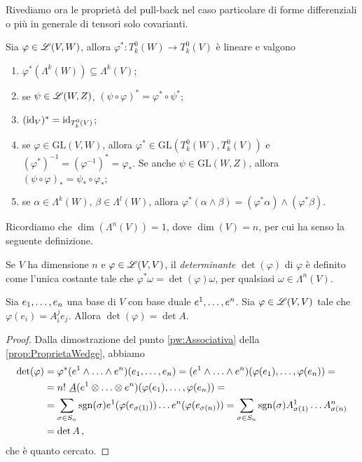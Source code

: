 Rivediamo ora le proprietà del pull-back nel caso particolare di forme differenziali o più in generale di tensori solo covarianti.
\begin{proposition} \label{prop:PullBackForme}
	Sia $\varphi\in\Lin(V,W)$, allora $\varphi^* : T^0_k(W) \to T^0_k(V)$ è lineare e valgono 
	\begin{enumerate}
		\item $\varphi^*(\Lambda^k(W)) \subseteq \Lambda^k(V)$;
		\item se $\psi\in\Lin(W,Z)$, $(\psi\circ\varphi)^* = \varphi^* \circ \psi^*$; \label{pbf:Composizione}
		\item $(\id_V)^* = \id_{T^0_k(V)}$;
		\item se $\varphi\in \mathrm{GL}(V,W)$, allora $\varphi^*\in \mathrm{GL}(T^0_k(W), T^0_k(V))$ e $(\varphi^*)^{-1} = (\varphi^{-1})^* = \varphi_*$. %
		Se anche $\psi\in\mathrm{GL}(W,Z)$, allora $(\psi\circ\varphi)_* = \psi_*\circ \varphi_*$;
		\item se $\alpha\in\Lambda^k(W)$, $\beta\in\Lambda^l(W)$, allora $\varphi^*(\alpha\wedge\beta) = (\varphi^*\alpha) \wedge (\varphi^*\beta)$.
	\end{enumerate}
\end{proposition}

Ricordiamo che $\dim(\Lambda^n(V)) = 1$, dove $\dim(V)=n$, per cui ha senso la seguente definizione.
\begin{definition} 
	Se $V$ ha dimensione $n$ e $\varphi\in\Lin(V,V)$, il \emph{determinante} $\det(\varphi)$ di $\varphi$ è definito come l'unica costante tale che $\varphi^*\omega = \det(\varphi) \omega$, per qualsiasi $\omega\in\Lambda^n(V)$.
\end{definition}

\begin{proposition} \label{prop:DeterminanteCoordinate}
	Sia $\seqb en,$ una base di $V$ con base duale $\seqa en,$. Sia $\varphi \in \Lin(V,V)$ tale che $\varphi(e_i) = A_i^je_j$.
	Allora $\det(\varphi) = \det A$.
\end{proposition}
\begin{proof}	
	Dalla dimostrazione del punto \ref{pw:Associativa} della \cref{prop:ProprietaWedge}, abbiamo
	\begin{align*}
		\det(\varphi) &=\varphi^*(\seqa en\wedge) (\seqb en,) = (\seqa en\wedge)(\varphi(e_1),\ldots, \varphi(e_n)) =\\
		&=n!\ \antisimm (\seqa en\otimes)(\varphi(e_1),\ldots,\varphi(e_n)) =\\
		&= \sum_{\sigma \in S_n} \sgn(\sigma) e^1(\varphi(e_{\sigma(1)})) \ldots e^n(\varphi(e_{\sigma(n)})) = \sum_{\sigma \in S_n} \sgn(\sigma) A^1_{\sigma(1)} \ldots A^n_{\sigma(n)}\\
		&=\det A
		\virgola
	\end{align*}
	che è quanto cercato.
\end{proof}

